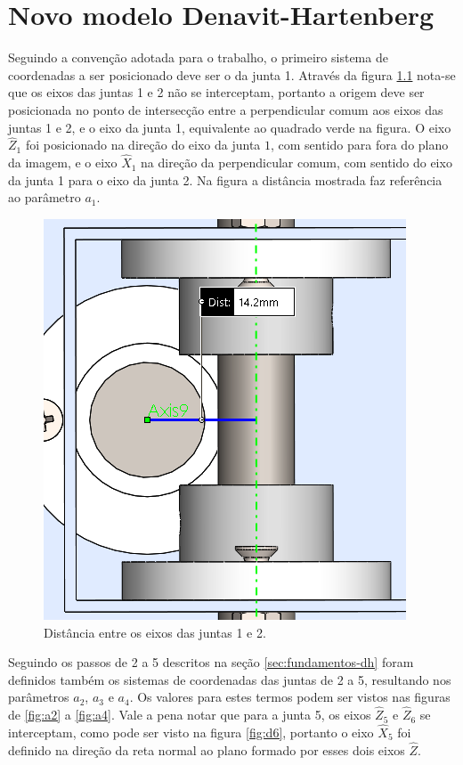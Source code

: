 \chapter{Novo modelo Denavit-Hartenberg}

\label{apendice-dh}

Seguindo a convenção adotada para o trabalho, o primeiro sistema de coordenadas a ser posicionado 
deve ser o da junta 1. 
Através da figura \ref{fig:a1} nota-se que os eixos das juntas 1 e 2 não se interceptam, portanto a 
origem deve ser posicionada no ponto de intersecção entre a perpendicular comum aos eixos das juntas 1 e 2,
e o eixo da junta 1, equivalente ao quadrado verde na figura.
O eixo $\hat{Z}_1$ foi posicionado na direção do eixo da junta $1$, com sentido para fora do plano da imagem,
e o eixo $\hat{X}_1$ na direção da perpendicular comum, com sentido do eixo da junta 1 para o eixo da junta 2.
Na figura a distância mostrada faz referência ao parâmetro $a_1$.

\begin{figure}[ht]
    \caption{Distância entre os eixos das juntas 1 e 2.}    
    \begin{centering}

        \includegraphics[width=0.5\columnwidth]{adendo/images/a1.png}
    
    \par\end{centering}

    \label{fig:a1}
\end{figure}

Seguindo os passos de 2 a 5 descritos na seção \ref{sec:fundamentos-dh} foram definidos também os sistemas
de coordenadas das juntas de 2 a 5, resultando nos parâmetros $a_2$, $a_3$ e $a_4$. Os valores para estes
termos podem ser vistos nas figuras de \ref{fig:a2} a \ref{fig:a4}. 
Vale a pena notar que para a junta 5, os eixos $\hat{Z}_5$ e $\hat{Z}_6$ se interceptam, como pode ser
visto na figura \ref{fig:d6}, portanto o eixo $\hat{X}_5$ foi definido na direção da reta normal ao plano 
formado por esses dois eixos $\hat{Z}$.  

